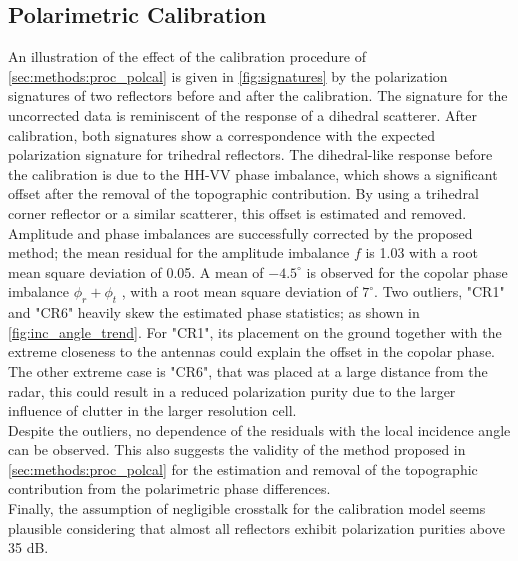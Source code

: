 \subsection{Polarimetric Calibration}
An illustration of the effect of the calibration procedure of \autoref{sec:methods:proc_polcal} is given in  \autoref{fig:signatures} by the polarization signatures of two reflectors before and after the calibration.
The signature for the uncorrected data is reminiscent of the response of a dihedral scatterer. After calibration, both signatures show a correspondence with the expected polarization signature for trihedral reflectors. The dihedral-like response before the calibration is due to the HH-VV phase imbalance, which shows a significant offset after the removal of the topographic contribution. By using a trihedral corner reflector or a similar scatterer, this offset is estimated and removed.\\
Amplitude and  phase imbalances are successfully corrected by the proposed method; the mean residual for the amplitude imbalance $f$ is 1.03 with a root mean square deviation of 0.05. A mean of $-4.5^\circ$ is observed for the copolar phase imbalance $\phi_r + \phi_t$ , with a root mean square deviation of $7^\circ$. Two outliers, "CR1" and "CR6" heavily skew the estimated phase statistics; as shown in \autoref{fig:inc_angle_trend}. For "CR1", its placement on the ground together with the extreme closeness to the antennas could explain the offset in the copolar phase. The other extreme case is "CR6", that was placed at a large distance from the radar, this could result in a reduced polarization purity due to the larger influence of clutter in the larger resolution cell.\\ 
Despite the outliers, no dependence of the residuals with the local incidence angle can be observed.
This also suggests the validity of the method proposed in \autoref{sec:methods:proc_polcal} for the estimation and removal of the topographic contribution from the polarimetric phase differences.\\Finally, the assumption of negligible crosstalk for the calibration model seems plausible considering that almost all reflectors exhibit polarization purities above 35 dB.
